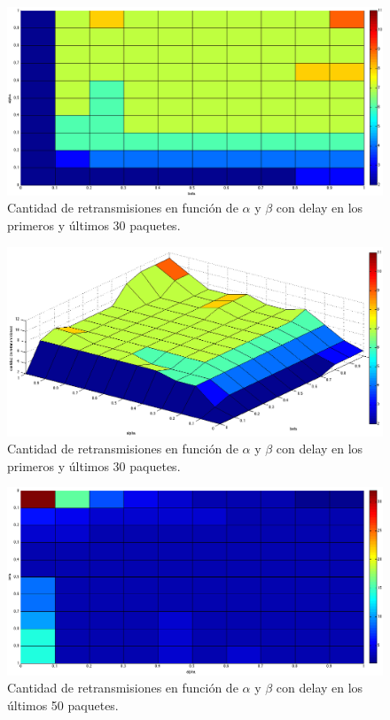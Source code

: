 \documentclass[10pt, a4paper]{article}
\begin{document}
\begin{figure}[H]
\begin{center}
\includegraphics[width=17cm]{delay-30I-ret-costado.png}
\caption{Cantidad de retransmisiones en función de $\alpha$ y $\beta$ con delay en los primeros y últimos 30 paquetes.}
\end{center}
\end{figure}

\begin{figure}[H]
\begin{center}
\includegraphics[width=17cm]{delay-30I-ret.png}
\caption{Cantidad de retransmisiones en función de $\alpha$ y $\beta$ con delay en los primeros y últimos 30 paquetes.}
\end{center}
\end{figure}


\begin{figure}[H]
\begin{center}
\includegraphics[width=17cm]{delay-50F-ret-costado.png}
\caption{Cantidad de retransmisiones en función de $\alpha$ y $\beta$ con delay en los últimos 50 paquetes.}
\end{center}
\end{figure}
\end{document}

